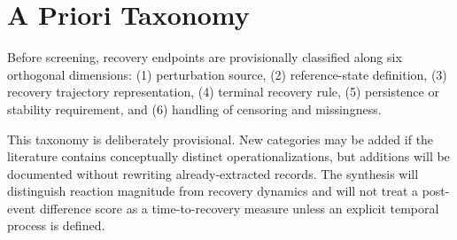 \section{A Priori Taxonomy}

Before screening, recovery endpoints are provisionally classified along six orthogonal dimensions: (1) perturbation source, (2) reference-state definition, (3) recovery trajectory representation, (4) terminal recovery rule, (5) persistence or stability requirement, and (6) handling of censoring and missingness.

This taxonomy is deliberately provisional. New categories may be added if the literature contains conceptually distinct operationalizations, but additions will be documented without rewriting already-extracted records. The synthesis will distinguish reaction magnitude from recovery dynamics and will not treat a post-event difference score as a time-to-recovery measure unless an explicit temporal process is defined.
